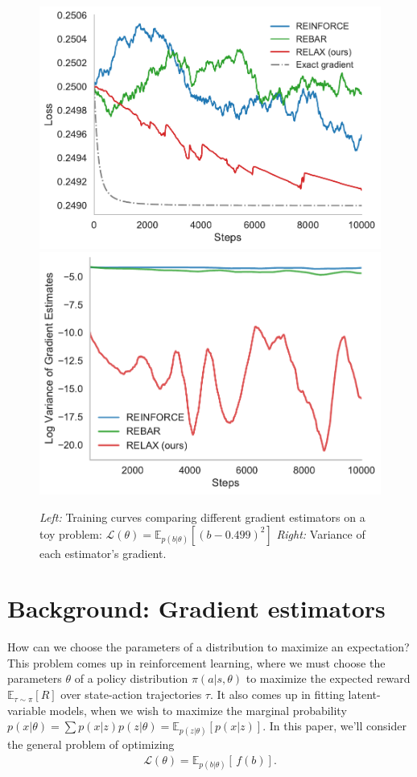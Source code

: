 \documentclass{article}
\newcommand{\discreteDist}{p(b|\theta)}
\newcommand{\loss}{f(b)}
\newcommand{\expectedLoss}{\mathbb{E}_{\discreteDist{}} \! \left[ \, \loss{} \right]}
\newcommand{\E}{\mathbb{E}}
\begin{document}
\begin{figure}[h]
	\hspace{-1em}
\includegraphics[width=.5\textwidth]{figures/toy_losses_10000_0_499}
\includegraphics[width=.5\textwidth]{figures/variance_100_t_499}
\caption{
\emph{Left:} Training curves comparing different gradient estimators on a toy problem: ${\mathcal{L}(\theta) = \E_{p(b|\theta)} [ (b - 0.499)^2 ]}$
\emph{Right:} Variance of each estimator's gradient.
}
\label{first figure}
\end{figure}


\section{Background: Gradient estimators}
How can we choose the parameters of a distribution to maximize an expectation?
This problem comes up in reinforcement learning, where we must choose the parameters $\theta$ of a policy distribution $\pi(a|s, \theta)$ to maximize the expected reward $\mathbb{E}_{\tau \sim \pi} \left[ R \right]$ over state-action trajectories $\tau$.
It also comes up in fitting latent-variable models, when we wish to maximize the marginal probability ${p(x|\theta) = \sum p(x|z) p(z|\theta) = \mathbb{E}_{p(z|\theta)} \left[ p(x|z) \right]}$.
In this paper, we'll consider the general problem of optimizing
%
\begin{align}
\mathcal{L}(\theta)=\expectedLoss{}.
\end{align}
%
\end{document}

